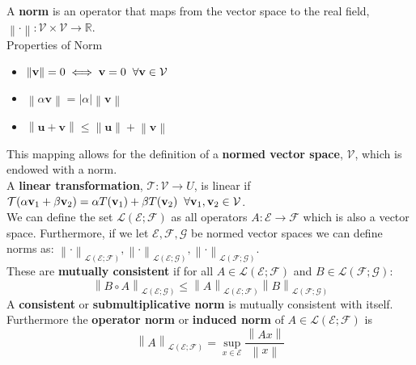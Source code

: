 \documentclass[a4paper]{article}
\newcommand{\norm}[1]{\left\lVert#1\right\rVert}
\begin{document}
\noindent A \textbf{norm} is an operator that maps from the vector space to the real field, $\norm{\cdot}:\mathcal{V}\times\mathcal{V}\rightarrow\mathbb{R}$.\\

\noindent Properties of Norm
\begin{itemize}
\item $\norm{\mathbf{v}} = 0 \iff \mathbf{v} = 0 \hspace{2mm} \forall\mathbf{v}\in\mathcal{V}$
\item $\norm{\alpha\mathbf{v}} = |\alpha|\norm{\mathbf{v}}$
\item $\norm{\mathbf{u+v}} \leq \norm{\mathbf{u}} + \norm{\mathbf{v}}$
\end{itemize}

\noindent This mapping allows for the definition of a \textbf{normed vector space}, $\mathcal{V}$, which is endowed with a norm.\\

\noindent A \textbf{linear transformation}, $\mathcal{T}:\mathcal{V}\rightarrow{U}$, is linear if $\mathcal{T}(\alpha\mathbf{v}_{1}+\beta\mathbf{v}_{2}) = \alpha T(\mathbf{v}_{1})+\beta T(\mathbf{v}_{2})\hspace{2mm}\forall \mathbf{v}_{1},\mathbf{v}_{2}\in\mathcal{V}$.\\ 

\noindent We can define the set $\mathcal{L}(\mathcal{E};\mathcal{F})$ as all operators $A:\mathcal{E}\rightarrow\mathcal{F}$ which is also a vector space. Furthermore, if we let $\mathcal{E}, \mathcal{F}, \mathcal{G}$ be normed vector spaces we can define norms as:
$\norm{\cdot}_{\mathcal{L}(\mathcal{E};\mathcal{F})},\norm{\cdot}_{\mathcal{L}(\mathcal{E};\mathcal{G})},\norm{\cdot}_{\mathcal{L}(\mathcal{F};\mathcal{G})}$.\\
These are \textbf{mutually consistent} if for all $A\in\mathcal{L}(\mathcal{E};\mathcal{F})$ and $B\in\mathcal{L}(\mathcal{F};\mathcal{G})$:
$$
\norm{B\circ A}_{\mathcal{L}(\mathcal{E};\mathcal{G})} \leq \norm{A}_{\mathcal{L}(\mathcal{E};\mathcal{F})}\norm{B}_{\mathcal{L}(\mathcal{F};\mathcal{G})}
$$
A \textbf{consistent} or \textbf{submultiplicative norm} is mutually consistent with itself.\\

\noindent Furthermore the \textbf{operator norm} or \textbf{induced norm} of $A\in\mathcal{L}(\mathcal{E};\mathcal{F})$ is
$$
\norm{A}_{\mathcal{L}(\mathcal{E};\mathcal{F})} = \sup_{x\in\mathcal{E}}\frac{\norm{Ax}}{\norm{x}}
$$
\end{document}

